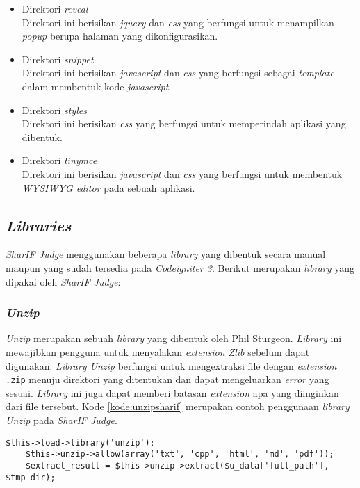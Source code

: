 \begin{itemize}
	\item Direktori \textit{reveal} \\Direktori ini berisikan \textit{jquery} dan \textit{css} yang berfungsi untuk menampilkan \textit{popup} berupa halaman yang dikonfigurasikan.
	\item Direktori \textit{snippet} \\Direktori ini berisikan \textit{javascript} dan \textit{css} yang berfungsi sebagai \textit{template} dalam membentuk kode \textit{javascript}.
	\item Direktori \textit{styles} \\Direktori ini berisikan \textit{css} yang berfungsi untuk memperindah aplikasi yang dibentuk.
	\item Direktori \textit{tinymce} \\Direktori ini berisikan \textit{javascript} dan \textit{css} yang berfungsi untuk membentuk \textit{WYSIWYG editor} pada sebuah aplikasi.
\end{itemize}

\subsection{\textit{Libraries}}
\textit{SharIF Judge} menggunakan beberapa \textit{library} yang dibentuk secara manual maupun yang sudah tersedia pada \textit{Codeigniter 3}. Berikut merupakan \textit{library} yang dipakai oleh \textit{SharIF Judge}:

\subsubsection{\textit{Unzip}}
\textit{Unzip} merupakan sebuah \textit{library} yang dibentuk oleh Phil Sturgeon. \textit{Library} ini mewajibkan pengguna untuk menyalakan \textit{extension Zlib} sebelum dapat digunakan. \textit{Library Unzip} berfungsi untuk mengextraksi file dengan \textit{extension} \texttt{.zip} menuju direktori yang ditentukan dan dapat mengeluarkan \textit{error} yang sesuai. \textit{Library} ini juga dapat memberi batasan \textit{extension} apa yang diinginkan dari file tersebut. Kode \ref{kode:unzipsharif} merupakan contoh penggunaan \textit{library Unzip} pada \textit{SharIF Judge}.

\begin{lstlisting}[caption=Contoh kode penggunaan \textit{Library Unzip}, label=kode:unzipsharif]
	$this->load->library('unzip');
	$this->unzip->allow(array('txt', 'cpp', 'html', 'md', 'pdf'));
	$extract_result = $this->unzip->extract($u_data['full_path'], $tmp_dir);
\end{lstlisting}


